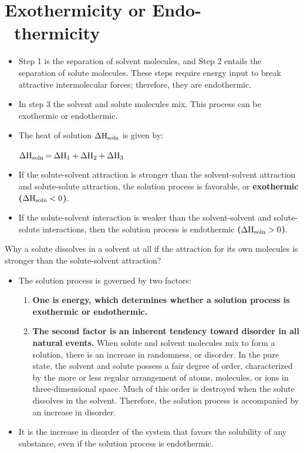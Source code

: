 \documentclass[a4paper,12pt,twocolumn]{article}
\begin{document}
\section{Exothermicity or Endo- \ thermicity}
\begin{itemize}
\item Step 1 is the separation of solvent molecules, and  Step 2 entails the separation of solute molecules. These steps require energy input to break attractive intermolecular forces; therefore, they are endothermic. 
\item In step 3 the solvent and solute molecules mix. This process can be exothermic or endothermic. 
\item The heat of solution $\ce{\Delta H_{soln}}$ is given by:
\begin{center}
$\ce{\Delta H_{soln} = \Delta H_{1} + \Delta H_{2} + \Delta H_{3}}$
\end{center}
\item If the solute-solvent attraction is stronger than the solvent-solvent attraction and solute-solute attraction, the solution process is favorable, or \textbf{exothermic ($\ce{\Delta H_{soln}}  < 0 $)}.
\item If the solute-solvent interaction is weaker than the solvent-solvent and solute-solute interactions, then the solution process is endothermic \textbf{($\ce{\Delta H_{soln}} > 0$)}.
\end{itemize}

\begin{Box2}{}
{\large Why a solute dissolves in a solvent at all if the attraction for its own molecules is stronger than the solute-solvent attraction?}
\end{Box2}
\begin{itemize}
\item The solution process is governed by two factors:
\begin{enumerate}
\item \textbf{One is energy, which determines whether a solution process is exothermic or endothermic.}
\item \textbf{The second factor is an inherent tendency toward disorder in all natural events.} When solute and solvent molecules mix to form a solution, there is an increase in randomness, or disorder. In the pure state, the solvent and solute possess a fair degree of order, characterized by the more or less regular arrangement of atoms, molecules, or ions in three-dimensional space. Much of this order is destroyed when the solute dissolves in the solvent. Therefore, the solution process is accompanied by an increase in disorder. 
\end{enumerate}
\item It is the increase in disorder of the system that favors the solubility of any substance, even if the solution process is endothermic.
\end{itemize}
\end{document}
